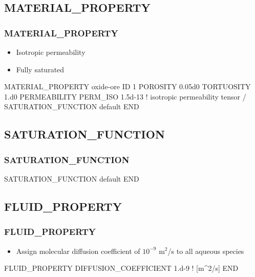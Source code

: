 \documentclass{beamer}
\newcommand\bluecomment[1]{{{\color{blue} #1}}}
\begin{document}
\subsection{MATERIAL\_PROPERTY}

\begin{frame}\frametitle{\bf MATERIAL\_PROPERTY}

\begin{itemize}
  \item Isotropic permeability
  \item Fully saturated
\end{itemize}

\begin{semiverbatim}
MATERIAL_PROPERTY oxide-ore
  ID 1
  POROSITY 0.05d0
  TORTUOSITY 1.d0
  PERMEABILITY
    PERM_ISO 1.5d-13 \bluecomment{! isotropic permeability tensor}
  /
  SATURATION_FUNCTION default
END
\end{semiverbatim}

\end{frame}

\subsection{SATURATION\_FUNCTION}

\begin{frame}[fragile]\frametitle{\bf SATURATION\_FUNCTION}


\begin{semiverbatim}
SATURATION_FUNCTION default
END
\end{semiverbatim}

\end{frame}

\subsection{\bf FLUID\_PROPERTY}

\begin{frame}\frametitle{\bf FLUID\_PROPERTY}

\begin{itemize}
  \item Assign molecular diffusion coefficient of $10^{-9}$ m$^2$/s to all aqueous species
\end{itemize}

\begin{semiverbatim}

FLUID_PROPERTY
  DIFFUSION_COEFFICIENT 1.d-9   \bluecomment{! [m^2/s]}
END
\end{semiverbatim}

\end{frame}
\end{document}
